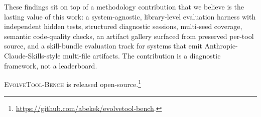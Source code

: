 \documentclass[sigplan,nonacm,natbib=false]{acmart}
\begin{document}
These findings sit on top of a methodology contribution that we believe is the lasting value of this work: a system-agnostic, library-level evaluation harness with independent hidden tests, structured diagnostic sessions, multi-seed coverage, semantic code-quality checks, an artifact gallery surfaced from preserved per-tool source, and a skill-bundle evaluation track for systems that emit Anthropic-Claude-Skills-style multi-file artifacts. The contribution is a diagnostic framework, not a leaderboard.

\textsc{EvolveTool-Bench} is released open-source.\footnote{\url{https://github.com/abekek/evolvetool-bench}.}





\end{document}
